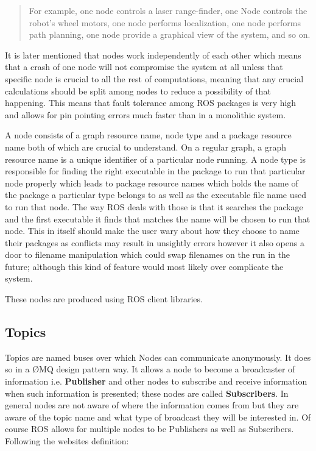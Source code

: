 \documentclass{report}
\begin{document}
      \begin{quote}
      For example, one node controls a laser range-finder, one Node controls the robot's wheel motors, one node performs localization, one node performs path planning, one node provide a graphical view of the system, and so on. \end{quote}

      It is later mentioned that nodes work independently of each other which means that a crash of one node will not compromise the system at all unless that specific node is crucial to all the rest of computations, meaning that any crucial calculations should be split among nodes to reduce a possibility of that happening. This means that fault tolerance among ROS packages is very high and allows for pin pointing errors much faster than in a monolithic system.

      A node consists of a graph resource name, node type and a package resource name both of which are crucial to understand. On a regular graph, a graph resource name is a unique identifier of a particular node running. A node type is responsible for finding the right executable in the package to run that particular node properly which leads to package resource names which holds the name of the package a particular type belongs to as well as the executable file name used to run that node. The way ROS deals with those is that it searches the package and the first executable it finds that matches the name will be chosen to run that node. This in itself should make the user wary about how they choose to name their packages as conflicts may result in unsightly errors however it also opens a door to filename manipulation which could swap filenames on the run in the future; although this kind of feature would most likely over complicate the system.

      These nodes are produced using ROS client libraries.

      \subsection{Topics}

      Topics are named buses over which Nodes can communicate anonymously. It does so in a ØMQ design pattern way. It allows a node to become a broadcaster of information i.e. \textbf{Publisher} and other nodes to subscribe and receive information when such information is presented; these nodes are called \textbf{Subscribers}. In general nodes are not aware of where the information comes from but they are aware of the topic name and what type of broadcast they will be interested in. Of course ROS allows for multiple nodes to be Publishers as well as Subscribers. Following the websites definition:
\end{document}
